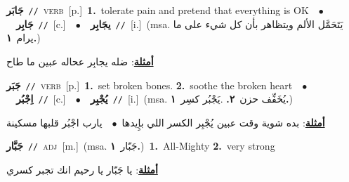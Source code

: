 \documentclass[10pt,a4paper,twoside]{article} %
\begin{document}
\begin{multicols}{2}
{\setlength\topsep{0pt}\textbf{\foreignlanguage{arabic}{جَابَر}}\ {\color{gray}\texttt{//}\color{black}}\ \textsc{verb}\ [p.]\ \textbf{1.}~tolerate pain and pretend that everything is OK\ \ $\bullet$\ \ \setlength\topsep{0pt}\textbf{\foreignlanguage{arabic}{جَابِر}}\ {\color{gray}\texttt{//}\color{black}}\ [c.]\ \ $\bullet$\ \ \setlength\topsep{0pt}\textbf{\foreignlanguage{arabic}{يجَابِر}}\ {\color{gray}\texttt{//}\color{black}}\ [i.]\ \color{gray}(msa. \foreignlanguage{arabic}{يَتَحَمَّل الألم ويتظاهر بأن كل شيء على ما يرام}~\foreignlanguage{arabic}{\textbf{١.}})\color{black}\  \begin{flushright}\color{gray}\foreignlanguage{arabic}{\textbf{\underline{\foreignlanguage{arabic}{أمثلة}}}: ضله يجابِر عحاله عبين ما طاح}\end{flushright}\color{black}} \vspace{2mm}

{\setlength\topsep{0pt}\textbf{\foreignlanguage{arabic}{جَبَر}}\ {\color{gray}\texttt{//}\color{black}}\ \textsc{verb}\ [p.]\ \textbf{1.}~set broken bones.  \textbf{2.}~soothe the broken heart\ \ $\bullet$\ \ \setlength\topsep{0pt}\textbf{\foreignlanguage{arabic}{اِجْبُر}}\ {\color{gray}\texttt{//}\color{black}}\ [c.]\ \ $\bullet$\ \ \setlength\topsep{0pt}\textbf{\foreignlanguage{arabic}{يُجْبِر}}\ {\color{gray}\texttt{//}\color{black}}\ [i.]\ \color{gray}(msa. \foreignlanguage{arabic}{يُخَفِّف حزن}~\foreignlanguage{arabic}{\textbf{٢.}}  .\foreignlanguage{arabic}{يَجْبُر كسِر}~\foreignlanguage{arabic}{\textbf{١.}})\color{black}\  \begin{flushright}\color{gray}\foreignlanguage{arabic}{\textbf{\underline{\foreignlanguage{arabic}{أمثلة}}}: بده شوية وقت عبين يُجْبِر الكسر اللي بإِيدها\ $\bullet$\ \  يارب اجْبُر قلبها مسكينة}\end{flushright}\color{black}} \vspace{2mm}

{\setlength\topsep{0pt}\textbf{\foreignlanguage{arabic}{جَبَّار}}\ {\color{gray}\texttt{//}\color{black}}\ \textsc{adj}\ [m.]\ \color{gray}(msa. \foreignlanguage{arabic}{جَبّار}~\foreignlanguage{arabic}{\textbf{١.}})\color{black}\ \textbf{1.}~All-Mighty  \textbf{2.}~very strong\  \begin{flushright}\color{gray}\foreignlanguage{arabic}{\textbf{\underline{\foreignlanguage{arabic}{أمثلة}}}: يا جَبّار يا رحيم انك تجبر كسري}\end{flushright}\color{black}} \vspace{2mm}


\end{multicols}
\end{document}

